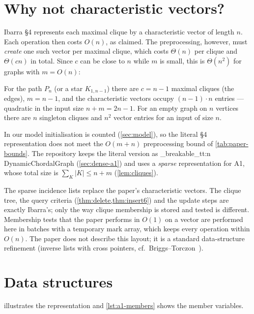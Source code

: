 \documentclass[11pt,a4paper,oneside]{report}
\theoremstyle{plain}
\theoremstyle{definition}
\theoremstyle{remark}
\DeclareRobustCommand{\code}[1]{\mtp_breakable_tt:n {#1}}
\begin{document}
\section{Why not characteristic vectors?}\label{sec:why-sparse}
Ibarra \S4 represents each maximal clique by a characteristic vector of length \(n\). Each
operation then costs \(O(n)\), as claimed. The preprocessing, however, must \emph{create} one
such vector per maximal clique, which costs \(\Theta(n)\) per clique and \(\Theta(cn)\) in
total. Since \(c\) can be close to \(n\) while \(m\) is small, this is \(\Theta(n^2)\) for
graphs with \(m=O(n)\):

\begin{example}
For the path \(P_n\) (or a star \(K_{1,n-1}\)) there are \(c=n-1\) maximal cliques (the edges),
\(m=n-1\), and the characteristic vectors occupy \((n-1)\cdot n\) entries --- quadratic in the
input size \(n+m=2n-1\). For an empty graph on \(n\) vertices there are \(n\) singleton cliques
and \(n^2\) vector entries for an input of size \(n\).
\end{example}

In our model initialisation is counted (\cref{sec:model}), so the literal \S4 representation
does not meet the \(O(m+n)\) preprocessing bound of \cref{tab:paper-bounds}. The repository
keeps the literal version as \code{DynamicChordalGraph} (\cref{sec:dense-a1}) and uses a
\emph{sparse} representation for A1, whose total size is \(\sum_{K}|K|\le n+m\)
(\cref{lem:cliques}).

\begin{caution}
The sparse incidence lists replace the paper's characteristic vectors. The clique tree, the
query criteria (\cref{thm:delete,thm:insert6}) and the update steps are exactly Ibarra's; only
the way clique membership is stored and tested is different. Membership tests that the paper
performs in \(O(1)\) on a vector are performed here in batches with a temporary mark array,
which keeps every operation within \(O(n)\). The paper does not describe this layout; it is a
standard data-structure refinement (inverse lists with cross pointers, cf.\
Briggs--Torczon~\cite{briggs1993}).
\end{caution}

\section{Data structures}\label{sec:a1-ds}
 illustrates the representation and \cref{lst:a1-members} shows the member
variables.
\end{document}
